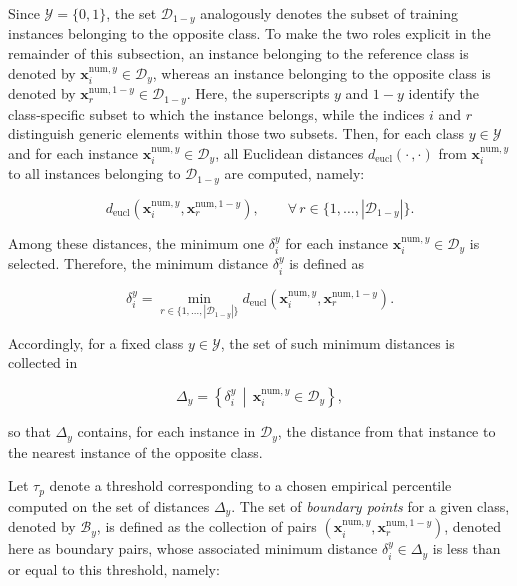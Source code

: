 Since $\mathcal{Y}=\{0,1\}$, the set $\mathcal{D}_{1-y}$ analogously denotes the subset of training instances belonging to the opposite class. To make the two roles explicit in the remainder of this subsection, an instance belonging to the reference class is denoted by $\mathbf{x}^{\mathrm{num}, y}_i \in \mathcal{D}_y$, whereas an instance belonging to the opposite class is denoted by $\mathbf{x}^{\mathrm{num}, 1-y}_r \in \mathcal{D}_{1-y}$. Here, the superscripts $y$ and $1-y$ identify the class-specific subset to which the instance belongs, while the indices $i$ and $r$ distinguish generic elements within those two subsets.
Then, for each class $y \in \mathcal{Y}$ and for each instance $\mathbf{x}^{\mathrm{num}, y}_i \in \mathcal{D}_{y}$, all Euclidean distances $d_{\mathrm{eucl}}(\cdot \, , \cdot)$ from $\mathbf{x}^{\mathrm{num}, y}_i$ to all instances belonging to $\mathcal{D}_{1-y}$ are computed, namely:

\begin{equation}
  d_{\mathrm{eucl}}\!\left(\mathbf{x}^{\mathrm{num}, y}_i, \mathbf{x}^{\mathrm{num}, 1-y}_r\right), \qquad \forall \, r \in \{1, \ldots, |\mathcal{D}_{1-y}|\}.
\end{equation}

Among these distances, the minimum one $\delta_i^{y}$ for each instance $\mathbf{x}^{\mathrm{num}, y}_i \in \mathcal{D}_{y}$ is selected. Therefore, the minimum distance $\delta_i^{y}$ is defined as

\begin{equation}
  \delta_i^{y} = \min_{r \in \{1, \ldots, |\mathcal{D}_{1-y}|\}} d_{\mathrm{eucl}}\!\left(\mathbf{x}^{\mathrm{num}, y}_i, \mathbf{x}^{\mathrm{num}, 1-y}_r\right).
\end{equation}

Accordingly, for a fixed class $y \in \mathcal{Y}$, the set of such minimum distances is collected in

\begin{equation}
  \Delta_{y} = \left\{ \delta_i^{y} \, \middle| \, \mathbf{x}^{\mathrm{num}, y}_i \in \mathcal{D}_{y} \right\},
\end{equation}

so that $\Delta_y$ contains, for each instance in $\mathcal{D}_{y}$, the distance from that instance to the nearest instance of the opposite class. 

Let $\tau_p$ denote a threshold corresponding to a chosen empirical percentile computed on the set of distances $\Delta_{y}$. The set of \emph{boundary points} for a given class, denoted by $\mathcal{B}_y$, is defined as the collection of pairs $(\mathbf{x}^{\mathrm{num}, y}_i, \mathbf{x}^{\mathrm{num}, 1-y}_r)$, denoted here as boundary pairs, whose associated minimum distance $\delta_i^y \in \Delta_y$ is less than or equal to this threshold, namely:

